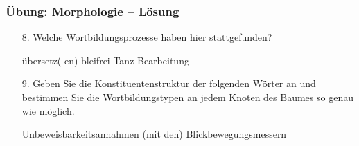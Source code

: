 
\begin{frame}
\frametitle{Übung: Morphologie -- Lösung}

\begin{itemize}
	\item[8.] Welche Wortbildungsprozesse haben hier stattgefunden?
	
	\begin{exe}
	\settowidth {}
	
		\begin{xlist}
			\ex übersetz(-en)  
			\ex bleifrei 
			\ex Tanz 
			\ex Bearbeitung 
		\end{xlist}
	
	\end{exe}

\end{itemize}

\end{frame}

\begin{frame}
	
\begin{itemize}
	\item[9.] Geben Sie die Konstituentenstruktur der folgenden Wörter an und bestimmen Sie die Wortbildungstypen an jedem Knoten des Baumes so genau wie möglich.
	
	\begin{exe}
		\exr{ex:09}
		
		\begin{xlist}
			\ex Unbeweisbarkeitsannahmen
			\ex (mit den) Blickbewegungsmessern
		\end{xlist}

	\end{exe}

\end{itemize}

\end{frame}


